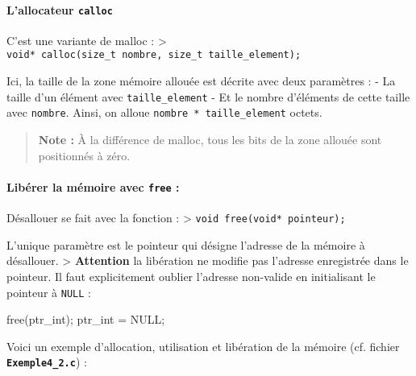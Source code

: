 \documentclass[11pt]{article}
\newenvironment{Shaded}{}{}
\newcommand{\NormalTok}[1]{{#1}}
\begin{document}
    \paragraph{\texorpdfstring{L'allocateur
\texttt{calloc}}{L'allocateur calloc}}\label{lallocateur-calloc}

C'est une variante de malloc : \textgreater{}
\texttt{void*\ calloc(size\_t\ nombre,\ size\_t\ taille\_element);}

Ici, la taille de la zone mémoire allouée est décrite avec deux
paramètres : - La taille d'un élément avec \texttt{taille\_element} - Et
le nombre d'éléments de cette taille avec \texttt{nombre}. Ainsi, on
alloue \texttt{nombre\ *\ taille\_element} octets.

\begin{quote}
\textbf{Note :} À la différence de malloc, tous les bits de la zone
allouée sont positionnés à zéro.
\end{quote}

    \paragraph{\texorpdfstring{Libérer la mémoire avec \texttt{free}
:}{Libérer la mémoire avec free :}}\label{libuxe9rer-la-muxe9moire-avec-free}

Désallouer se fait avec la fonction : \textgreater{}
\texttt{void\ free(void*\ pointeur);}

L'unique paramètre est le pointeur qui désigne l'adresse de la mémoire à
désallouer. \textgreater{} \textbf{Attention} la libération ne modifie
pas l'adresse enregistrée dans le pointeur. Il faut explicitement
oublier l'adresse non-valide en initialisant le pointeur à \texttt{NULL}
:

\begin{Shaded}
\begin{Highlighting}[]
\NormalTok{    free(ptr_int);}
\NormalTok{    ptr_int = NULL;}
\end{Highlighting}
\end{Shaded}

    Voici un exemple d'allocation, utilisation et libération de la mémoire
(cf. fichier \textbf{\texttt{Exemple4\_2.c}}) :
\end{document}
